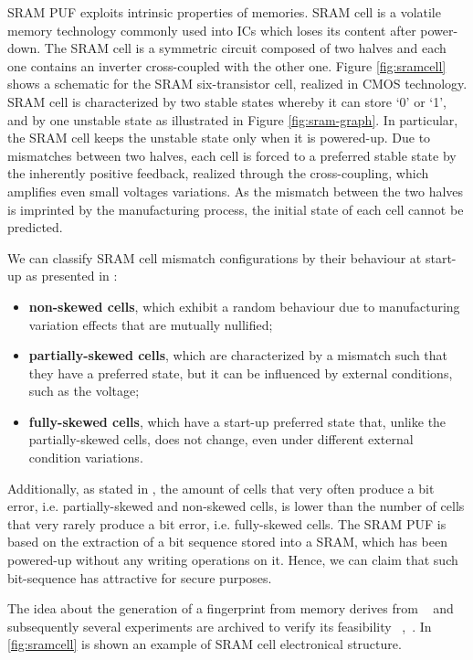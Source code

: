 \documentclass[../tesi.tex]{subfiles}
\begin{document}
SRAM PUF exploits intrinsic properties of memories. 
SRAM cell is a volatile memory technology commonly used into ICs which loses its content after power-down. The SRAM cell is a symmetric circuit composed of two halves and each one contains an inverter cross-coupled with the other one. Figure \ref{fig:sramcell} shows a schematic for the SRAM six-transistor cell, realized in CMOS technology. SRAM cell is characterized by two stable states whereby it can store `0' or `1', and by one unstable state as illustrated in Figure \ref{fig:sram-graph}. In particular, the SRAM cell keeps the unstable state only when it is powered-up. Due to mismatches between two halves, each cell is forced to a preferred stable state by the inherently positive feedback, realized through the cross-coupling, which amplifies even small voltages variations. As the mismatch between the two halves is imprinted by the manufacturing process, the initial state of each cell cannot be predicted. 

We can classify SRAM cell mismatch configurations by their behaviour at start-up as presented in \cite{cortez2012modeling}: 
\begin{itemize}
\item \textbf{non-skewed cells}, which exhibit a random behaviour due to manufacturing variation effects that are mutually nullified;
\item \textbf{partially-skewed cells}, which are characterized by a mismatch such that they have a preferred state, but it can be influenced by external conditions, such as the voltage;
\item \textbf{fully-skewed cells}, which have a start-up preferred state that, unlike the partially-skewed cells, does not change, even under different external condition variations.
\end{itemize}
Additionally, as stated in \cite{maes2009low}, the amount of cells that very often produce a bit error, i.e. partially-skewed and non-skewed cells, is lower than the number of cells that very rarely produce a bit error, i.e. fully-skewed cells. The SRAM PUF is based on the extraction of a bit sequence stored into a SRAM, which has been powered-up without any writing operations on it. Hence, we can claim that such bit-sequence has attractive for secure purposes.

The idea about the generation of a fingerprint from memory derives from ~\cite{layman2004electronic} and subsequently several experiments are archived to verify its feasibility ~\cite{holcomb2007initial},~\cite{holcomb2009power}. In \ref{fig:sramcell} is shown an example of SRAM cell electronical structure. 
\end{document}
